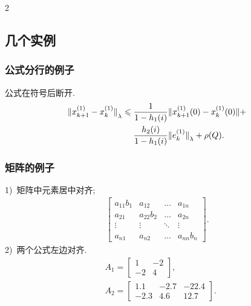 \documentclass[authordraft]{ctacn}%
\begin{document}
\begin{multicols}{2}
\subsection{几个实例}

\subsubsection{公式分行的例子}
公式在符号后断开.
\begin{align}
{\Arrowvert x^{(1)}_{k+1}-x^{(1)}_k\Arrowvert}_\lambda\leqslant \;&
\frac{1}{1-h_1(i)}\Arrowvert x^{(1)}_{k+1}(0)-x^{(1)}_k(0)\Arrowvert+\notag\\
&\frac{h_2(i)}{1-h_1(i)}{\Arrowvert
	e^{(1)}_k\Arrowvert}_\lambda+\rho(Q).
\end{align}


\subsubsection{矩阵的例子}
1)~矩阵中元素居中对齐;
\begin{align}
\left[\begin{array}{cccc}
a_{11}b_1& a_{12}&\dots &a_{1n}\\
a_{21}& a_{22}b_2&\dots &a_{2n}\\
\vdots&\vdots& \ddots   &\vdots\\
a_{n1}& a_{n2}&\dots &a_{nn}b_n
\end{array}\right].\end{align}
2)~两个公式左边对齐.
\begin{align}
&A_1=\left[\begin{array}{cc} 1& -2\\-2 &4
\end{array}\right],\\
&A_2=\left[\begin{array}{ccc} 1.1 &-2.7&-22.4\\-2.3 &4.6 &12.7
\end{array}\right].
\end{align}



\end{multicols}
\end{document}
